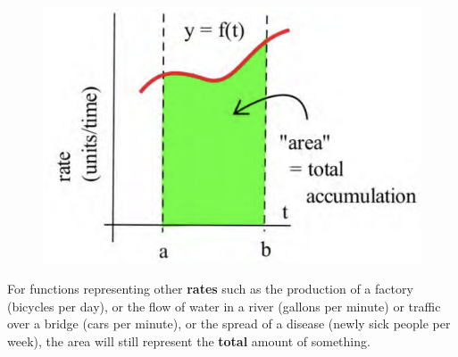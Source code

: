 \begin{figure}
\includegraphics[scale=0.35]{images/defIntgArea/rate_TotalAmt.png}
\caption{ }
\label{fig:rate_TotalAmt}
\end{figure}

\noindent For functions representing other \textbf{rates} such as the production of a factory (bicycles per day), or the flow of water in a river (gallons per minute) or traffic over a bridge (cars per minute), or the spread of a disease (newly sick people per week), the area will still represent the \textbf{total} amount of something.\\

